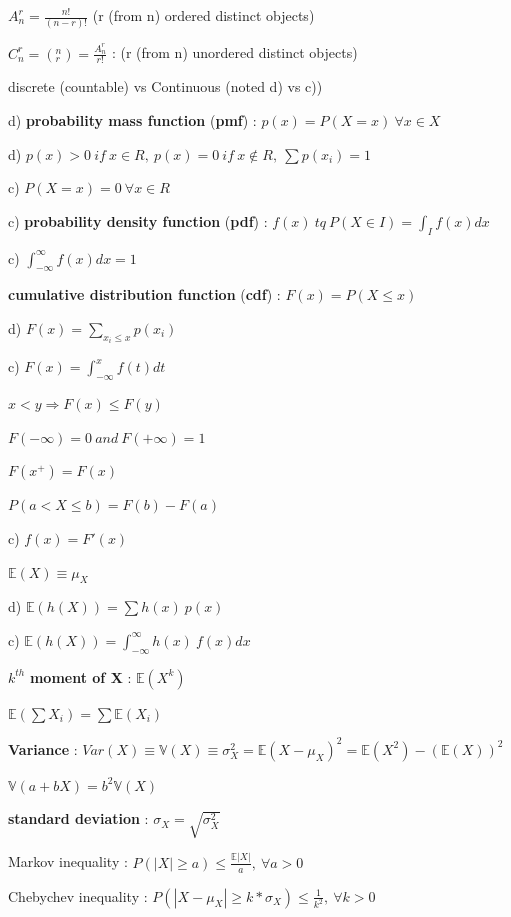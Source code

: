 \documentclass[a4paper,10.5pt]{article}
\begin{document}
\begin{multicols}{4}
		$A_n^r = \frac{n!}{(n-r)!}$ (r (from n) ordered distinct objects)
		
		$C_n^r = (_r^n) = \frac{A_n^r}{r!}$ : (r (from n) unordered distinct objects)
		
		
		discrete (countable) vs Continuous (noted d) vs c))
		
		d) \textbf{probability mass function} (\textbf{pmf}) : $p(x) = P(X=x)\ \forall x\in X$
		
		d) $p(x)>0\ if\ x\in R,\ p(x) = 0\ if\ x\notin R,\ \sum p(x_i) = 1$
		
		c) $P(X=x)=0\ \forall x\in R$
		
		c) \textbf{probability density function} (\textbf{pdf}) : $ f(x)\ tq\ P(X\in I) = \int_I f(x) dx$
		
		c) $\int_{-\infty}^{\infty} f(x) dx = 1$
		
		\textbf{cumulative distribution function} (\textbf{cdf}) : $F(x) = P(X\leq x)$
		
		d) $F(x) = \sum_{x_i\leq x} p(x_i)$
		
		c) $F(x) = \int_{-\infty}^{x} f(t) dt$
		
		$x<y \Rightarrow F(x) \leq F(y)$
		
		$F(-\infty ) = 0\ and\ F(+\infty )=1$
		
		$F(x^+) = F(x)$
		
		$P(a<X\leq b) = F(b) - F(a)$
		
		c) $f(x) = F'(x)$
		
		$\mathbb{E}(X) \equiv \mu_X$
		
		d) $\mathbb{E}(h(X)) = \sum h(x)\ p(x)$
		
		c) $\mathbb{E}(h(X)) = \int_{-\infty}^{\infty}h(x)\ f(x)dx$
		
		$k^{th}$ \textbf{moment of X} : $\mathbb{E}(X^k)$
		
		$\mathbb{E}(\sum X_i) = \sum \mathbb{E}(X_i)$
		
		\textbf{Variance} : $Var(X) \equiv \mathbb{V}(X) \equiv \sigma_X^2 = \mathbb{E}(X-\mu_X)^2 = \mathbb{E}(X^2) - (\mathbb{E}(X))^2$
		
		$\mathbb{V}(a+bX) = b^2 \mathbb{V}(X)$
		
		\textbf{standard deviation} : $\sigma_X = \sqrt{\sigma_X^2}$
		
		Markov inequality : $P(|X| \geq a) \leq \frac{\mathbb{E}|X|}{a},\ \forall a>0$
		
		Chebychev inequality : $P(|X-\mu_X| \geq k*\sigma_X) \leq \frac{1}{k^2},\ \forall k>0$
		

\end{multicols}
\end{document}
